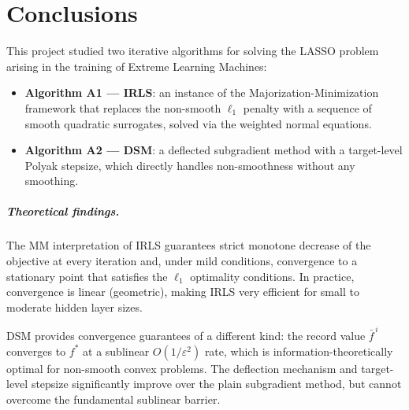 \chapter{Conclusions}
\label{chap:conclusions}

This project studied two iterative algorithms for solving the LASSO problem arising
in the training of Extreme Learning Machines:
\begin{itemize}[nosep]
    \item \textbf{Algorithm A1 — IRLS}: an instance of the Majorization-Minimization
    framework that replaces the non-smooth $\ell_1$ penalty with a sequence of smooth
    quadratic surrogates, solved via the weighted normal equations.
    \item \textbf{Algorithm A2 — DSM}: a deflected subgradient method with a
    target-level Polyak stepsize, which directly handles non-smoothness without
    any smoothing.
\end{itemize}

\paragraph{Theoretical findings.}
The MM interpretation of IRLS guarantees strict monotone decrease of the objective
at every iteration and, under mild conditions, convergence to a stationary point
that satisfies the $\ell_1$ optimality conditions.
In practice, convergence is linear (geometric), making IRLS very efficient for
small to moderate hidden layer sizes.

DSM provides convergence guarantees of a different kind: the record value
$\bar{f}^{\,i}$ converges to $f^*$ at a sublinear $O(1/\varepsilon^2)$ rate,
which is information-theoretically optimal for non-smooth convex problems.
The deflection mechanism and target-level stepsize significantly improve over the
plain subgradient method, but cannot overcome the fundamental sublinear barrier.


